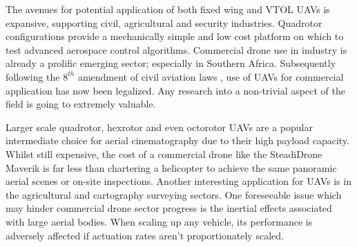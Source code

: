 \par
The avenues for potential application of both fixed wing and VTOL UAVs is expansive, supporting civil\cite{civilquadcopter}, agricultural\cite{agriculturequadcopter} and security\cite{videosurveillancequadcopter} industries. Quadrotor configurations provide a mechanically simple and low cost platform on which to test advanced aerospace control algorithms. Commercial drone use in industry is already a prolific emerging sector; especially in Southern Africa. Subsequently following the $8^{th}$ amendment of civil aviation laws \cite{dronelaw}, use of UAVs for commercial application has now been legalized. Any research into a non-trivial aspect of the field is going to extremely valuable. 
\par
Larger scale quadrotor, hexrotor and even octorotor UAVs are a popular intermediate choice for aerial cinematography due to their high payload capacity.  Whilst still expensive, the cost of a commercial drone like the SteadiDrone Maverik \cite{steadidrone} is far less than chartering a helicopter to achieve the same panoramic aerial scenes or on-site inspections. Another interesting application for UAVs is in the agricultural and cartography surveying sectors. One foreseeable issue which may hinder commercial drone sector progress is the inertial effects associated with large aerial bodies. When scaling up any vehicle, its performance is adversely affected if actuation rates aren't proportionately scaled.
